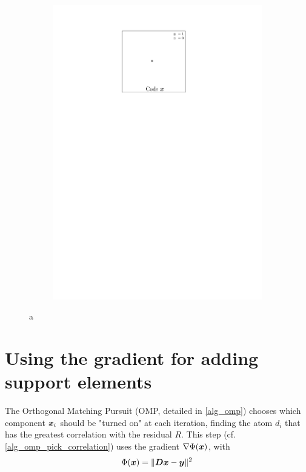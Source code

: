 \begin{figure}[!ht]
\begin{subfigure}[b]{0.32\textwidth}
	\includegraphics[width=\textwidth]{figures/xp_explain/code.pdf}
	\caption{}
\end{subfigure}
\caption{a} \label{fig_xp_explain}
\end{figure}

\section{Using the gradient for adding support elements}

The Orthogonal Matching Pursuit (OMP, detailed in \cref{alg_omp}) chooses which component $\bm{x}_i$ should be "turned on" at each iteration, finding the atom $d_i$ that has the greatest correlation with the residual $R$. This step (cf. \cref{alg_omp_pick_correlation}) uses the gradient $\nabla \Phi(\bm{x})$, with $$\Phi(\bm{x}) = \lVert \bm{D}\bm{x} - \bm{y} \rVert^2$$


